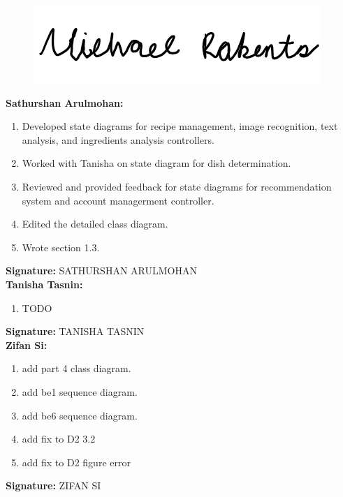 \documentclass[]{article}
\begin{document}
\begin{figure}[H]
 	\centering
    \includegraphics[width=\textwidth]{image/A_Michael_Roberts_Signature.png}
\end{figure}

\textbf{Sathurshan Arulmohan:}
\begin{enumerate}
	\item Developed state diagrams for recipe management, image recognition, text analysis, and ingredients analysis controllers.
	\item Worked with Tanisha on state diagram for dish determination.
	\item Reviewed and provided feedback for state diagrams for recommendation system and account managerment controller.
	\item Edited the detailed class diagram.
	\item Wrote section 1.3.
\end{enumerate}

\textbf{Signature:} SATHURSHAN ARULMOHAN \\

\textbf{Tanisha Tasnin:}
\begin{enumerate}
	\item TODO
\end{enumerate}

\textbf{Signature:} TANISHA TASNIN \\

\textbf{Zifan Si:}
\begin{enumerate}
	\item add part 4 class diagram.
	\item add be1 sequence diagram.
	\item add be6 sequence diagram.
	\item add fix to D2 3.2
	\item add fix to D2 figure error
\end{enumerate}

\textbf{Signature:} ZIFAN SI  \\
\end{document}
